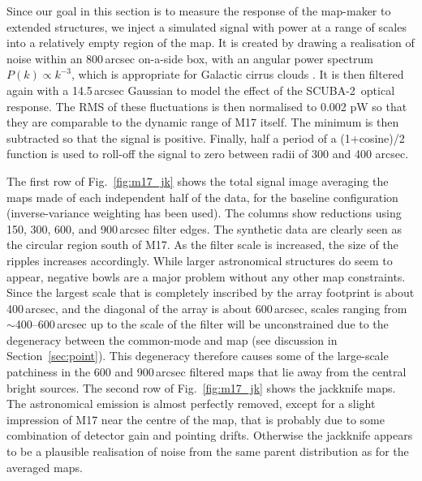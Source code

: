\documentclass[useAMS,usenatbib,nofootinbib]{mn2e}
\newcommand{\scuba}{SCUBA-2}
\begin{document}
Since our goal in this section is to measure the response of the
map-maker to extended structures, we inject a simulated signal with
power at a range of scales into a relatively empty region of the map.
It is created by drawing a realisation of noise within an 800\,arcsec
on-a-side box, with an angular power spectrum $P(k) \propto k^{-3}$,
which is appropriate for Galactic cirrus clouds
\citep[e.g.,][]{gautier1992}. It is then filtered again with a
14.5\,arcsec Gaussian to model the effect of the \scuba\ optical
response. The RMS of these fluctuations is then normalised to 0.002 pW
so that they are comparable to the dynamic range of M17 itself. The
minimum is then subtracted so that the signal is positive. Finally,
half a period of a (1+cosine)/2 function is used to roll-off the
signal to zero between radii of 300 and 400 arcsec.

The first row of Fig.~\ref{fig:m17_jk} shows the total signal image
averaging the maps made of each independent half of the data, for the
baseline configuration (inverse-variance weighting has been used). The
columns show reductions using 150, 300, 600, and 900\,arcsec filter
edges. The synthetic data are clearly seen as the circular region
south of M17. As the filter scale is increased, the size of the
ripples increases accordingly. While larger astronomical structures do
seem to appear, negative bowls are a major problem without any other
map constraints. Since the largest scale that is completely inscribed
by the array footprint is about 400\,arcsec, and the diagonal of the
array is about 600\,arcsec, scales ranging from $\sim$400--600\,arcsec
up to the scale of the filter will be unconstrained due to the
degeneracy between the common-mode and map (see discussion in
Section~\ref{sec:point}). This degeneracy therefore causes some of the
large-scale patchiness in the 600 and 900\,arcsec filtered maps that
lie away from the central bright sources.  The second row of
Fig.~\ref{fig:m17_jk} shows the jackknife maps. The astronomical
emission is almost perfectly removed, except for a slight impression
of M17 near the centre of the map, that is probably due to some
combination of detector gain and pointing drifts. Otherwise the
jackknife appears to be a plausible realisation of noise from the same
parent distribution as for the averaged maps.
\end{document}

